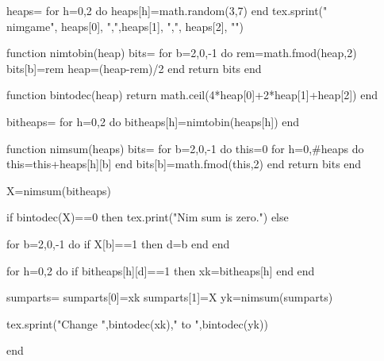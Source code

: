 \documentclass{article}
\begin{document}
\begin{luacode}
heaps={}
for h=0,2 do
    heaps[h]=math.random(3,7)
end
tex.sprint("\\nimgame{", heaps[0], ",",heaps[1], ",", heaps[2], "}")

function nimtobin(heap)
    bits={}
    for b=2,0,-1 do
        rem=math.fmod(heap,2)
        bits[b]=rem
        heap=(heap-rem)/2
    end
    return bits
end

function bintodec(heap)
    return math.ceil(4*heap[0]+2*heap[1]+heap[2])
end

bitheaps={}
for h=0,2 do
    bitheaps[h]=nimtobin(heaps[h])
end

function nimsum(heaps)
    bits={}
    for b=2,0,-1 do
        this=0
        for h=0,#heaps do
            this=this+heaps[h][b]
        end
        bits[b]=math.fmod(this,2)
    end
    return bits
end

X=nimsum(bitheaps)

if bintodec(X)==0 then
    tex.print("Nim sum is zero.")
else

    for b=2,0,-1 do
        if X[b]==1 then
            d=b
        end
    end
    
    for h=0,2 do
        if bitheaps[h][d]==1 then
            xk=bitheaps[h]
        end
    end
    
    sumparts={}
    sumparts[0]=xk
    sumparts[1]=X
    yk=nimsum(sumparts)
    
    tex.sprint("Change ",bintodec(xk)," to ",bintodec(yk))

end

\end{luacode}
\end{document}
